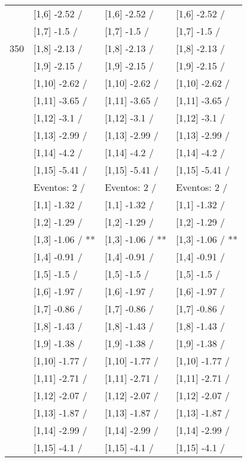 \begin{table}
\begin{tabular}[t]{llll}
 & {}[1,6] -2.52  / & {}[1,6] -2.52  / & {}[1,6] -2.52  /\\
 & {}[1,7] -1.5  / & {}[1,7] -1.5  / & {}[1,7] -1.5  /\\
350 & {}[1,8] -2.13  / & {}[1,8] -2.13  / & {}[1,8] -2.13  /\\
\addlinespace
 & {}[1,9] -2.15  / & {}[1,9] -2.15  / & {}[1,9] -2.15  /\\
 & {}[1,10] -2.62  / & {}[1,10] -2.62  / & {}[1,10] -2.62  /\\
 & {}[1,11] -3.65  / & {}[1,11] -3.65  / & {}[1,11] -3.65  /\\
 & {}[1,12] -3.1  / & {}[1,12] -3.1  / & {}[1,12] -3.1  /\\
 & {}[1,13] -2.99  / & {}[1,13] -2.99  / & {}[1,13] -2.99  /\\
\addlinespace
 & {}[1,14] -4.2  / & {}[1,14] -4.2  / & {}[1,14] -4.2  /\\
 & {}[1,15] -5.41  / & {}[1,15] -5.41  / & {}[1,15] -5.41  /\\
 & Eventos:  2 / & Eventos:  2 / & Eventos:  2 /\\
 & {}[1,1] -1.32  / & {}[1,1] -1.32  / & {}[1,1] -1.32  /\\
 & {}[1,2] -1.29  / & {}[1,2] -1.29  / & {}[1,2] -1.29  /\\
\addlinespace
 & {}[1,3] -1.06  / ** & {}[1,3] -1.06  / ** & {}[1,3] -1.06  / **\\
 & {}[1,4] -0.91  / & {}[1,4] -0.91  / & {}[1,4] -0.91  /\\
 & {}[1,5] -1.5  / & {}[1,5] -1.5  / & {}[1,5] -1.5  /\\
 & {}[1,6] -1.97  / & {}[1,6] -1.97  / & {}[1,6] -1.97  /\\
 & {}[1,7] -0.86  / & {}[1,7] -0.86  / & {}[1,7] -0.86  /\\
\addlinespace
500 & {}[1,8] -1.43  / & {}[1,8] -1.43  / & {}[1,8] -1.43  /\\
 & {}[1,9] -1.38  / & {}[1,9] -1.38  / & {}[1,9] -1.38  /\\
 & {}[1,10] -1.77  / & {}[1,10] -1.77  / & {}[1,10] -1.77  /\\
 & {}[1,11] -2.71  / & {}[1,11] -2.71  / & {}[1,11] -2.71  /\\
 & {}[1,12] -2.07  / & {}[1,12] -2.07  / & {}[1,12] -2.07  /\\
\addlinespace
 & {}[1,13] -1.87  / & {}[1,13] -1.87  / & {}[1,13] -1.87  /\\
 & {}[1,14] -2.99  / & {}[1,14] -2.99  / & {}[1,14] -2.99  /\\
 & {}[1,15] -4.1  / & {}[1,15] -4.1  / & {}[1,15] -4.1  /\\
\bottomrule
\end{tabular}
\end{table}
